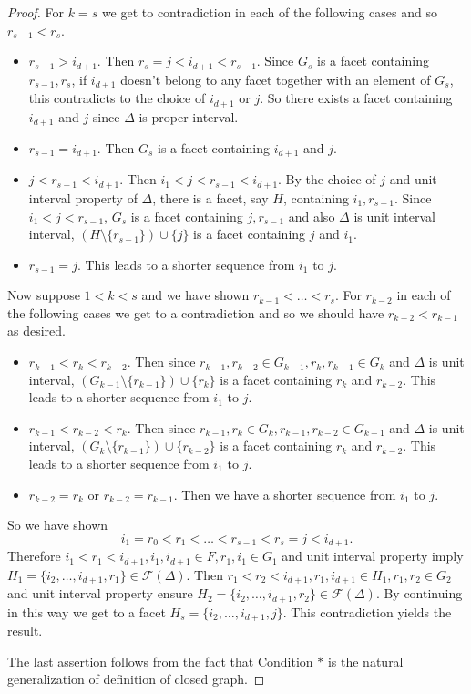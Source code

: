 \documentclass[12pt,reqno]{amsart}
\theoremstyle{plain}
\theoremstyle{definition}
\numberwithin{equation}{section}
\begin{document}
\begin{proof}
For $k=s$ we get to contradiction in each of the following cases and so $r_{s-1}<r_s$.
\begin{itemize}
  \item $r_{s-1}> i_{d+1}$.  Then $r_s=j<i_{d+1}<r_{s-1}$. Since $G_s$ is a facet containing $r_{s-1}, r_s$, if $i_{d+1}$  doesn't belong to any facet together with an element of $G_s$, this contradicts to the choice of $i_{d+1}$ or $j$. So there exists a facet containing $i_{d+1}$ and $j$ since $\Delta$ is proper interval.
  \item $r_{s-1}= i_{d+1}$.  Then $G_s$ is a facet containing $i_{d+1}$ and $j$.
  \item $j<r_{s-1}< i_{d+1}$. Then $i_1<j <r_{s-1}<i_{d+1}$. By the choice of $j$ and unit interval property of $\Delta$, there is a facet, say $H$, containing $i_1, r_{s-1}$. Since $i_1<j<r_{s-1}$, $G_s$ is a facet containing $j,r_{s-1}$ and also $\Delta$ is unit interval interval, $(H\setminus\{r_{s-1}\})\cup \{j\}$ is a facet containing $j$ and $i_1$.
  \item $r_{s-1}=j$. This leads to a shorter sequence from $i_1$ to $j$.
\end{itemize}
Now suppose $1<k<s$ and we have shown $r_{k-1}<\dots < r_s$.  For $r_{k-2}$ in each of the following cases we get to a contradiction and so we should have $r_{k-2}<r_{k-1}$ as desired.
\begin{itemize}
  \item $r_{k-1}<r_k<r_{k-2}$. Then since $r_{k-1}, r_{k-2}\in G_{k-1}, r_k, r_{k-1}\in G_k$ and $\Delta$ is unit interval, $(G_{k-1}\setminus \{r_{k-1}\}) \cup \{r_k\}$ is a facet containing $r_k$ and $r_{k-2}$. This leads to a shorter sequence from $i_1$ to $j$.
  \item $r_{k-1}<r_{k-2}<r_k$. Then since $r_{k-1}, r_k\in G_k, r_{k-1}, r_{k-2}\in G_{k-1}$ and $\Delta$ is unit interval, $(G_k\setminus \{r_{k-1}\}) \cup \{r_{k-2}\}$ is a facet containing $r_k$ and $r_{k-2}$. This leads to a shorter sequence from $i_1$ to $j$.
   \item $r_{k-2}=r_k$ or $r_{k-2}=r_{k-1}$. Then we have a shorter sequence from $i_1$ to $j$.
\end{itemize}
So we have shown
$$i_1=r_0<r_1<\dots <r_{s-1}<r_s=j< i_{d+1}.$$
Therefore $i_1<r_1<i_{d+1}, i_1,i_{d+1}\in F, r_1, i_1\in G_1$ and unit interval property imply $H_1=\{i_2, \dots , i_{d+1}, r_1\}\in \mathcal{F}(\Delta )$. 
Then $r_1<r_2<i_{d+1},  r_1, i_{d+1}\in H_1, r_1,r_2\in G_2$ and unit interval property ensure $H_2=\{i_2, \dots , i_{d+1}, r_2\}\in \mathcal{F}(\Delta )$. By continuing in this way we get to a facet
$H_s=\{i_2, \dots , i_{d+1}, j\}$. This contradiction yields the result.

The last assertion follows from the fact that Condition $*$ is the natural generalization of definition of closed graph. 
\end{proof}
\end{document}
